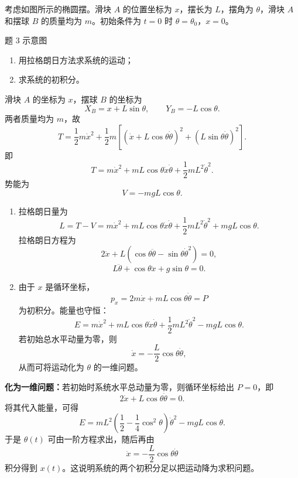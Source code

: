 \begin{question}[椭圆摆]
考虑如图所示的椭圆摆。滑块 $A$ 的位置坐标为 $x$，摆长为 $L$，摆角为 $\theta$，滑块 $A$ 和摆球 $B$ 的质量均为 $m$。初始条件为 $t=0$ 时 $\theta=\theta_0$，$x=0$。

\begin{center}

{\small 题 3 示意图}
\end{center}

\begin{enumerate}
  \item 用拉格朗日方法求系统的运动；
  \item 求系统的初积分。
\end{enumerate}

\begin{solution}
滑块 $A$ 的坐标为 $x$，摆球 $B$ 的坐标为
\[
  X_B=x+L\sin\theta,
  \qquad
  Y_B=-L\cos\theta .
\]
两者质量均为 $m$，故
\[
  T=\frac12m\dot x^2+\frac12m\left[(\dot x+L\cos\theta\dot\theta)^2
  +(L\sin\theta\dot\theta)^2\right].
\]
即
\[
  T=m\dot x^2+mL\cos\theta\dot x\dot\theta+\frac12mL^2\dot\theta^2.
\]
势能为
\[
  V=-mgL\cos\theta.
\]
\begin{enumerate}
  \item 拉格朗日量为
  \[
    L=T-V=m\dot x^2+mL\cos\theta\dot x\dot\theta
    +\frac12mL^2\dot\theta^2+mgL\cos\theta.
  \]
  拉格朗日方程为
  \[
    2\ddot x+L\left(\cos\theta\ddot\theta-\sin\theta\dot\theta^2\right)=0,
  \]
  \[
    L\ddot\theta+\cos\theta\ddot x+g\sin\theta=0.
  \]
  \item 由于 $x$ 是循环坐标，
  \[
    p_x=2m\dot x+mL\cos\theta\dot\theta=P
  \]
  为初积分。能量也守恒：
  \[
    E=m\dot x^2+mL\cos\theta\dot x\dot\theta+\frac12mL^2\dot\theta^2-mgL\cos\theta.
  \]
  若初始总水平动量为零，则
  \[
    \dot x=-\frac L2\cos\theta\dot\theta,
  \]
  从而可将运动化为 $\theta$ 的一维问题。
\end{enumerate}


\medskip
\textbf{化为一维问题：}若初始时系统水平总动量为零，则循环坐标给出 $P=0$，即
\[
  2\dot x+L\cos\theta\dot\theta=0.
\]
将其代入能量，可得
\[
  E=mL^2\left(\frac12-\frac14\cos^2\theta\right)\dot\theta^2-mgL\cos\theta.
\]
于是 $\theta(t)$ 可由一阶方程求出，随后再由
\[
  \dot x=-\frac L2\cos\theta\dot\theta
\]
积分得到 $x(t)$。这说明系统的两个初积分足以把运动降为求积问题。
\end{solution}
\end{question}

